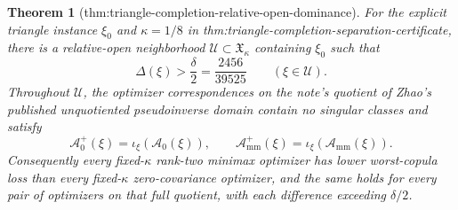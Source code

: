 \documentclass{article}
\newtheorem{theorem}{Theorem}
\begin{document}
\begin{theorem}[thm:triangle-completion-relative-open-dominance]\label{thm:triangle-completion-relative-open-dominance}
For the explicit triangle instance \(\xi_0\) and \(\kappa=1/8\) in thm:triangle-completion-separation-certificate, there is a relative-open neighborhood \(\mathcal U\subset\mathfrak X_\kappa\) containing \(\xi_0\) such that
\[
\Delta(\xi)>\frac{\delta}{2}=\frac{2456}{39525}
\qquad(\xi\in\mathcal U).
\]
Throughout \(\mathcal U\), the optimizer correspondences on the note's quotient of Zhao's published unquotiented pseudoinverse domain contain no singular classes and satisfy
\[
\mathcal A_0^+(\xi)=\iota_\xi(\mathcal A_0(\xi)),
\qquad
\mathcal A_{\mathrm{mm}}^+(\xi)=\iota_\xi(\mathcal A_{\mathrm{mm}}(\xi)).
\]
Consequently every fixed-\(\kappa\) rank-two minimax optimizer has lower worst-copula loss than every fixed-\(\kappa\) zero-covariance optimizer, and the same holds for every pair of optimizers on that full quotient, with each difference exceeding \(\delta/2\).
\end{theorem}
\end{document}
